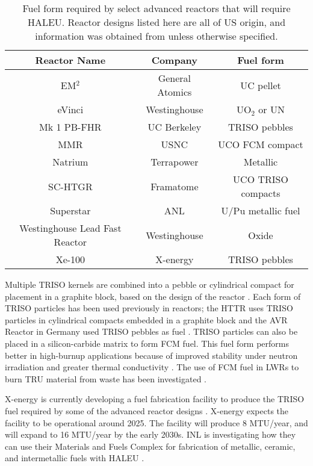 \begin{table}
    \centering
    \caption{Fuel form required by select advanced reactors that will 
    require \gls{HALEU}. Reactor designs listed here are all of US origin, 
    and information was obtained from \cite{hussain_advances_2018} unless 
    otherwise specified.}
    \label{tab:fuel_forms}
    \begin{tabular}{c c c}
        \hline
        Reactor Name & Company & Fuel form \\\hline 
        EM$^2$ & General Atomics & UC pellet \\
        eVinci & Westinghouse & UO$_2$ or UN \\
        Mk 1 PB-FHR & UC Berkeley & TRISO pebbles\\
        \gls{MMR} \cite{mitchell_usnc_2020} & \gls{USNC} & UCO FCM compact\\
        Natrium & Terrapower & Metallic \\
        SC-HTGR & Framatome & UCO TRISO compacts \\
        Superstar  & \gls{ANL} & U/Pu metallic fuel \\
        Westinghouse Lead Fast Reactor  & Westinghouse & Oxide \\
        Xe-100 \cite{harlan_x-energy_2018} & X-energy & TRISO pebbles \\
        \hline        
        
    \end{tabular}
\end{table}

Multiple \gls{TRISO} kernels are combined into a pebble or 
cylindrical compact for placement in a graphite block, based on the 
design of the reactor \cite{demkowicz_coated_2019}. Each form of 
\gls{TRISO} particles has been used previously in reactors; the \gls{HTTR}
uses 
\gls{TRISO} particles in cylindrical compacts embedded in a graphite block 
\cite{shiozawa_overview_2004} and the AVR Reactor in Germany used 
\gls{TRISO} pebbles as fuel \cite{gottaut_results_1990}.
\gls{TRISO} particles can also be placed in a silicon-carbide matrix 
to form \gls{FCM} fuel. This fuel form performs better in high-burnup 
applications because of improved stability under neutron irradiation and 
greater thermal conductivity \cite{snead_fully_2011}. The use of 
\gls{FCM} fuel in \glspl{LWR} to burn \gls{TRU} material from waste 
has been investigated \cite{snead_fully_2011,venneri_fully_2011}. 

X-energy is currently developing a fuel fabrication facility to 
produce the \gls{TRISO} fuel required by some of the advanced 
reactor designs \cite{noauthor_triso-x_2022}. X-energy expects the 
facility to be operational around 2025. The facility will 
produce 8 MTU/year, and will expand to 16 MTU/year 
by the early 2030s. \gls{INL} is investigating 
how they can use their Materials and Fuels Complex for 
fabrication of metallic, ceramic, and intermetallic fuels with 
\gls{HALEU} \cite{crawford_fuel_2019}. 

